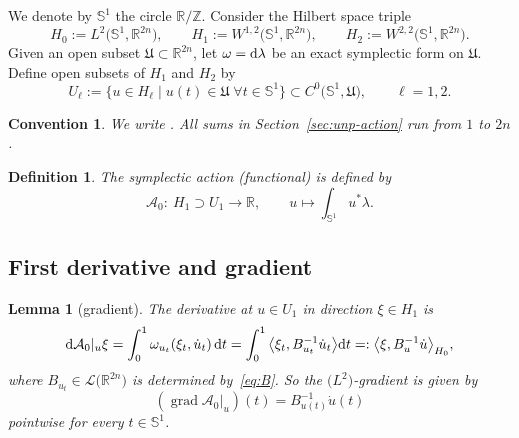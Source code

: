 \documentclass[pdftex]{sigma}
\numberwithin{equation}{section}
\newtheorem{Lemma}[Theorem]{Lemma}
\newtheorem{Definition}[Theorem]{Definition}
\newtheorem*{Convention*}{Convention}
\newcommand{\R}{{\mathbb{R}}}
\renewcommand{\SS}{{\mathbb{S}}}
\newcommand{\Z}{{\mathbb{Z}}}
\newcommand{\Aa}{{\mathcal{A}}} %
\newcommand{\Ll}{{\mathcal{L}}} %
\newcommand{\grad}{\mathop{\mathrm{grad}}} %
\newcommand{\1}{{{\mathchoice {\rm 1\mskip-4mu l} {\rm 1\mskip-4mu l}
{\rm 1\mskip-4.5mu l} {\rm 1\mskip-5mu l}}}}
\begin{document}
We denote by $\SS^1$ the circle $\R/\Z$.
Consider the Hilbert space triple
\begin{equation}\label{eq:triple}
 H_0:=L^2\bigl(\SS^1,\R^{2n}\bigr),\qquad
 H_1:=W^{1,2}\bigl(\SS^1,\R^{2n}\bigr),\qquad
 H_2:=W^{2,2}\bigl(\SS^1,\R^{2n}\bigr).
\end{equation}
Given an open subset $\mathfrak{U}\subset\R^{2n}$,
let $\omega={\rm d}\lambda$ be an exact symplectic form on $\mathfrak{U}$.
Define open subsets of $H_1$ and $H_2$ by
\begin{equation}\label{eq:U_2}
 U_\ell:=\bigl\{u\in H_\ell\mid u(t)\in\mathfrak{U}\; \forall t\in\SS^1\bigr\}
 \subset C^0\bigl(\SS^1,\mathfrak{U}\bigr),\qquad \ell=1,2.
\end{equation}
%
\begin{Convention*}
We write
.
All sums in Section~\ref{sec:unp-action} run from $1$ to $2n$.
\end{Convention*}

\begin{Definition}
The \textit{symplectic action} (functional) is defined by
\begin{equation}\label{le:action_0}
 \Aa_0\colon\ H_1\supset U_1\to\R
 ,\qquad
 u\mapsto \int_{\SS^1} u^*\lambda .
\end{equation}
\end{Definition}

\subsection{First derivative and gradient}

\begin{Lemma}[gradient]\label{le:gradient}
The derivative at $u\in U_1$ in direction $\xi\in H_1$ is
\[
 {\rm d}\Aa_0|_u\xi
 =\int_0^1\omega_{u_t}(\xi_t,\dot u_t)\, {\rm d}t
 =\int_0^1\big\langle{\xi_t},{B^{-1}_{u_t}\dot u_t}\big\rangle {\rm d}t
 =:\big\langle{\xi},{B^{-1}_{u}\dot u}\big\rangle_{H_0},
\]
where $B_{u_t}\in\Ll\bigl(\R^{2n}\bigr)$ is determined by~\eqref{eq:B}.
So the \textit{$\bigl(L^2\bigr)$-gradient} is given by
\[
 (\grad \Aa_0|_u )(t)=B_{u(t)}^{-1}\dot u(t)
\]
pointwise for every $t\in\SS^1$.
\end{Lemma}
\end{document}
